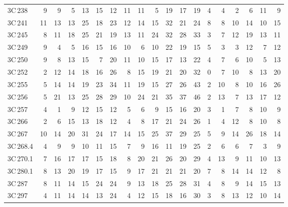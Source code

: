 \documentclass[mathleft,fleqn,%
]{an}
\begin{document}
\begin{table*}
\begin{tabular}{l|rrrrrr|rrrrrr|rrrrrr}
     3C\,238 &    9 &     9 &    5 &  13 &  15 &  12  &   11 &  11 &   5 &  19 &  17 &  19  &    4 &   4 &   2 &   6 &  11 &   9 \\
     3C\,241 &   11 &    13 &   13 &  25 &  18 &  23  &   12 &  14 &  15 &  32 &  21 &  24  &    8 &   8 &  10 &  14 &  10 &  15 \\
     3C\,245 &    8 &    11 &   18 &  25 &  21 &  19  &   13 &  11 &  24 &  32 &  28 &  33  &    3 &   7 &  12 &  19 &  13 &  11 \\
     3C\,249 &    9 &     4 &    5 &  16 &  15 &  16  &   10 &   6 &  10 &  22 &  19 &  15  &    5 &   3 &   3 &  12 &   7 &  12 \\
     3C\,250 &    9 &     8 &   13 &  15 &   7 &  20  &   11 &  10 &  15 &  17 &  13 &  22  &    4 &   7 &   6 &  10 &   5 &  13 \\
     3C\,252 &    2 &    12 &   14 &  18 &  16 &  26  &    8 &  15 &  19 &  21 &  20 &  32  &    0 &   7 &  10 &   8 &  13 &  20 \\
     3C\,255 &    5 &    14 &   14 &  19 &  23 &  34  &   11 &  19 &  15 &  27 &  26 &  43  &    2 &  10 &   8 &  10 &  16 &  26 \\
     3C\,256 &    5 &    21 &   13 &  25 &  28 &  29  &   10 &  24 &  21 &  35 &  37 &  46  &    2 &  13 &   7 &  13 &  17 &  12 \\
     3C\,257 &    4 &     1 &    9 &  12 &  15 &  12  &    5 &   6 &   9 &  15 &  16 &  20  &    3 &   1 &   7 &   8 &  10 &   9 \\
     3C\,266 &    2 &     6 &   15 &  13 &  18 &  12  &    4 &   8 &  17 &  21 &  24 &  26  &    1 &   4 &  12 &   8 &  10 &   8 \\
     3C\,267 &   10 &    14 &   20 &  31 &  24 &  17  &   14 &  15 &  25 &  37 &  29 &  25  &    5 &   9 &  14 &  26 &  18 &  14 \\
   3C\,268.4 &    4 &     9 &    9 &  10 &  11 &  15  &    7 &   9 &  16 &  11 &  19 &  25  &    2 &   6 &   6 &   7 &   3 &   9 \\
   3C\,270.1 &    7 &    16 &   17 &  17 &  15 &  18  &    8 &  20 &  21 &  26 &  20 &  29  &    4 &  13 &   9 &  11 &  10 &  13 \\
   3C\,280.1 &    8 &    13 &   20 &  19 &  17 &  15  &    9 &  17 &  21 &  21 &  21 &  20  &    7 &   8 &  14 &  14 &  12 &   8 \\
     3C\,287 &    8 &    11 &   14 &  15 &  24 &  24  &    9 &  13 &  18 &  25 &  28 &  31  &    4 &   8 &   9 &  14 &  15 &  13 \\
     3C\,297 &    4 &    11 &   14 &  14 &  13 &  24  &    4 &  12 &  15 &  18 &  16 &  30  &    3 &   8 &  13 &  12 &  10 &  14 \\

\end{tabular}
\end{table*}
\end{document}

